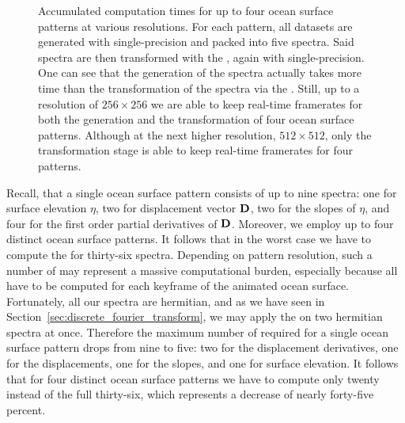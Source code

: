 \begin{figure}
\caption{Accumulated computation times for up to four ocean surface patterns at
various resolutions. For each pattern, all datasets are generated with
single-precision and packed into five spectra. Said spectra are then
transformed with the \IDFT, again with single-precision. One can see that the
generation of the spectra actually takes more time than the transformation of
the spectra via the \IDFT. Still, up to a resolution of $256 \times 256$ we are
able to keep real-time framerates for both the generation and the transformation
of four ocean surface patterns. Although at the next higher resolution,
$512 \times 512$, only the transformation stage is able to keep real-time
framerates for four patterns.
}
\label{fig:gen:idft}
\end{figure}
%
Recall, that a single ocean surface pattern consists of up to nine spectra:
one for surface elevation $\eta$, two for displacement vector $\mathbf{D}$,
two for the slopes of $\eta$, and four for the first order partial derivatives
of $\mathbf{D}$.
Moreover, we employ up to four distinct ocean surface patterns.
It follows that in the worst case we have to compute the
\InvDiscreteFourierTransform for thirty-six spectra. Depending on pattern
resolution, such a number of \IDFTs may represent a massive computational
burden, especially because all \IDFTs have to be computed for each keyframe
of the animated ocean surface.
Fortunately, all our spectra are hermitian, and as we have seen in
Section~\ref{sec:discrete_fourier_transform}, we may apply the
\InvDiscreteFourierTransform on two hermitian spectra at once.
Therefore the maximum number of required \IDFTs for a single ocean surface
pattern drops from nine to five: two for the displacement derivatives,
one for the displacements, one for the slopes, and one for surface elevation.
It follows that for four distinct ocean surface patterns we have to compute
only twenty \IDFTs instead of the full thirty-six, which represents a decrease
of nearly forty-five percent.

